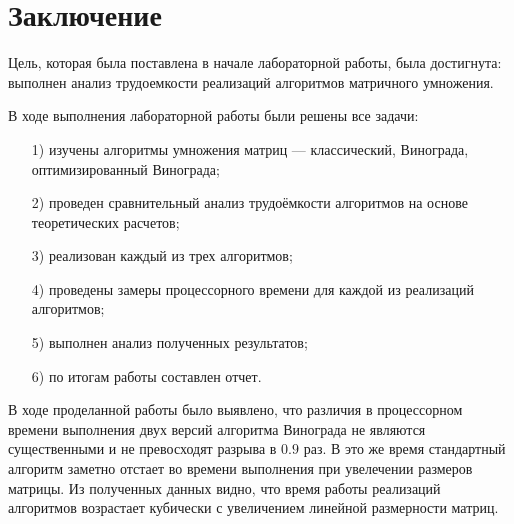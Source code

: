 \chapter*{Заключение}

Цель, которая была поставлена в начале лабораторной работы, была достигнута: выполнен анализ трудоемкости реализаций алгоритмов матричного умножения.

В ходе выполнения лабораторной работы были решены все задачи:
\begin{enumerate}
	\item[1)] изучены алгоритмы умножения матриц --- классический, Винограда, оптимизированный Винограда;
\item[2)] проведен сравнительный анализ трудоёмкости алгоритмов на основе теоретических расчетов;
\item[3)] реализован каждый из трех алгоритмов;
\item[4)] проведены замеры процессорного времени для каждой из реализаций алгоритмов;
\item[5)] выполнен анализ полученных результатов;
\item[6)] по итогам работы составлен отчет.
\end{enumerate}

В ходе проделанной работы было выявлено, что различия в процессорном времени выполнения двух версий алгоритма Винограда не являются существенными и не превосходят разрыва в $0.9$ раз. В это же время стандартный алгоритм заметно отстает во времени выполнения при увелечении размеров матрицы. Из полученных данных видно, что время работы реализаций алгоритмов возрастает  кубически с увеличением линейной размерности матриц.
